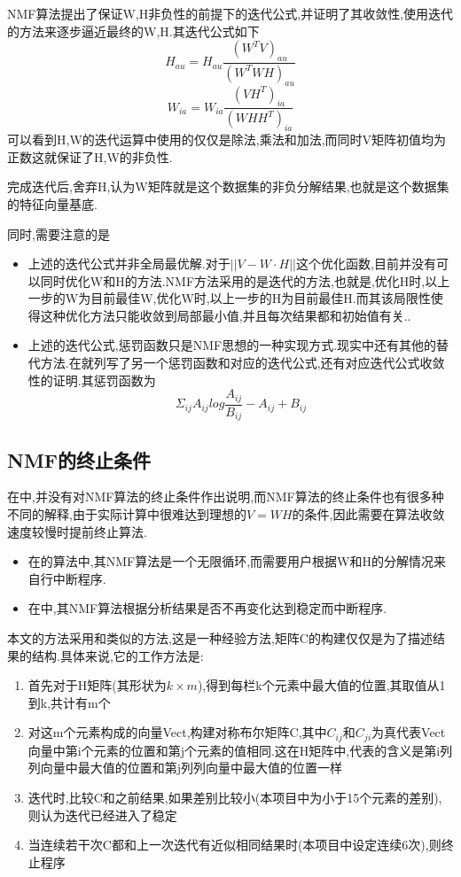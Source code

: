 NMF算法提出了保证W,H非负性的前提下的迭代公式,并证明了其收敛性,使用迭代的方法来逐步逼近最终的W,H.其迭代公式如下
	\begin{equation}
		\label{equ: nmf_iter1}
		H_{au} = H_{au}\frac{(W^TV)_{au}}{(W^TWH)_{au}}
	\end{equation}
	\begin{equation}
		\label{equ: nmf_iter2}
		W_{ia} = W_{ia}\frac{(VH^T)_{ia}}{(WHH^T)_{ia}}	
	\end{equation}
可以看到H,W的迭代运算中使用的仅仅是除法,乘法和加法,而同时V矩阵初值均为正数这就保证了H,W的非负性.

完成迭代后,舍弃H,认为W矩阵就是这个数据集的非负分解结果,也就是这个数据集的特征向量基底.\newline

同时,需要注意的是
\begin{itemize}
	\item 上述的迭代公式并非全局最优解.对于$||V-W\cdot H||$这个优化函数,目前并没有可以同时优化W和H的方法.NMF方法采用的是迭代的方法,也就是,优化H时,以上一步的W为目前最佳W,优化W时,以上一步的H为目前最佳H.而其该局限性使得这种优化方法只能收敛到局部最小值,并且每次结果都和初始值有关.\cite{berry2007algorithms}.
	\item 上述的迭代公式,惩罚函数只是NMF思想的一种实现方式.现实中还有其他的替代方法.在\cite{lee1999learning, lee2001algorithms}就列写了另一个惩罚函数和对应的迭代公式,还有对应迭代公式收敛性的证明.其惩罚函数为$$\Sigma_{ij}A_{ij} log \frac{A_{ij}}{B_{ij}} - A_{ij} + B_{ij}$$
\end{itemize}

\subsection{NMF的终止条件}
在\cite{lee1999learning, lee2001algorithms}中,并没有对NMF算法的终止条件作出说明,而NMF算法的终止条件也有很多种不同的解释,由于实际计算中很难达到理想的$V=WH$的条件,因此需要在算法收敛速度较慢时提前终止算法.
\begin{itemize}
	\item 在\cite{hoyer2004non}的算法中,其NMF算法是一个无限循环,而需要用户根据W和H的分解情况来自行中断程序.
	\item 在\cite{brunet2004metagenes}中,其NMF算法根据分析结果是否不再变化达到稳定而中断程序.
\end{itemize} 

本文的方法采用和\cite{brunet2004metagenes}类似的方法,这是一种经验方法,矩阵C的构建仅仅是为了描述结果的结构.具体来说,它的工作方法是:
	\begin{enumerate}
		\item 首先对于H矩阵(其形状为$k \times m$),得到每栏k个元素中最大值的位置,其取值从1到k,共计有m个
		\item 对这m个元素构成的向量Vect,构建对称布尔矩阵C,其中$C_{ij}$和$C_{ji}$为真代表Vect向量中第i个元素的位置和第j个元素的值相同.这在H矩阵中,代表的含义是第i列列向量中最大值的位置和第j列列向量中最大值的位置一样
		\item 迭代时,比较C和之前结果,如果差别比较小(本项目中为小于15个元素的差别),则认为迭代已经进入了稳定
		\item 当连续若干次C都和上一次迭代有近似相同结果时(本项目中设定连续6次),则终止程序
	\end{enumerate}

